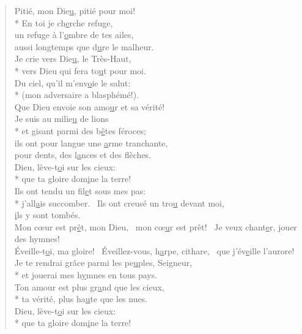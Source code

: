 
\begin{verse}
Pitié, mon Die\underline{u}, pitié pour moi! \\*
En toi je ch\underline{e}rche refuge, \\
un refuge à l’\underline{o}mbre de tes ailes, \\
aussi longtemps que d\underline{u}re le malheur. \\

Je crie vers Die\underline{u}, le Très-Haut, \\*
vers Dieu qui fera to\underline{u}t pour moi. \\
Du ciel, qu’il m’env\underline{o}ie le salut: \\*
(mon adversaire a blasphémé!). \\
Que Dieu envoie son amo\underline{u}r et sa vérité! \\

Je suis au milie\underline{u} de lions \\*
et gisant parmi des b\underline{ê}tes féroces; \\
ils ont pour langue une \underline{a}rme tranchante, \\
pour dents, des l\underline{a}nces et des flèches. \\

Dieu, lève-t\underline{o}i sur les cieux: \\*
que ta gloire dom\underline{i}ne la terre! \\

Ils ont tendu un fil\underline{e}t sous mes pas: \\*
j’all\underline{a}is succomber.~\psalmstar
Ils ont creusé un tro\underline{u} devant moi, \\
\underline{i}ls y sont tombés. \\

Mon cœur est pr\underline{ê}t, mon Dieu,~\psalmdagger
mon cœ\underline{u}r est prêt!~\psalmstar
Je veux chant\underline{e}r, jouer des hymnes! \\

Éveille-t\underline{o}i, ma gloire!~\psalmdagger
Éveillez-vous, h\underline{a}rpe, cithare,~\psalmstar
que j’év\underline{e}ille l’aurore! \\

Je te rendrai grâce parmi les pe\underline{u}ples, Seigneur, \\*
et jouerai mes h\underline{y}mnes en tous pays. \\
Ton amour est plus gr\underline{a}nd que les cieux, \\*
ta vérité, plus ha\underline{u}te que les nues. \\

Dieu, lève-t\underline{o}i sur les cieux: \\*
que ta gloire dom\underline{i}ne la terre! \\
\end{verse}

